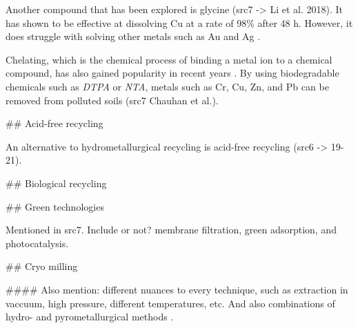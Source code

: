 Another compound that has been explored is glycine (src7 -> Li et al. 2018). It has shown to be effective at dissolving Cu at a rate of 98\% after 48 h. However, it does struggle with solving other metals such as Au and Ag \cite{javed2024}.

Chelating, which is the chemical process of binding a metal ion to a chemical compound, has also gained popularity in recent years \cite{javed2024}. By using biodegradable chemicals such as \textit{DTPA} or \textit{NTA}, metals such as Cr, Cu, Zn, and Pb can be removed from polluted soils (src7 Chauhan et al.).



## Acid-free recycling

An alternative to hydrometallurgical recycling is acid-free recycling (src6 -> 19-21).

## Biological recycling

## Green technologies

Mentioned in src7. Include or not? membrane filtration, green adsorption, and photocatalysis.

## Cryo milling


#### Also mention:
different nuances to every technique, such as extraction in vaccuum, high pressure, different temperatures, etc. And also combinations of hydro- and pyrometallurgical methods \cite{javed2024}.
